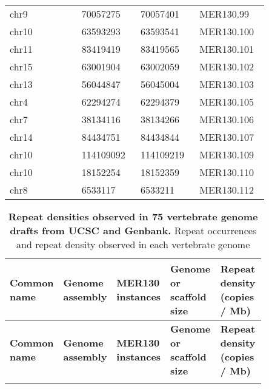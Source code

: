 \begin{center}
\begin{longtable}{@{}p{0.25\linewidth}p{0.2\linewidth}p{0.2\linewidth}p{0.2\linewidth}@{}}
chr9 & 70057275 & 70057401 & MER130.99\tabularnewline
chr10 & 63593293 & 63593541 & MER130.100\tabularnewline
chr11 & 83419419 & 83419565 & MER130.101\tabularnewline
chr15 & 63001904 & 63002059 & MER130.102\tabularnewline
chr13 & 56044847 & 56045004 & MER130.103\tabularnewline
chr4 & 62294274 & 62294379 & MER130.105\tabularnewline
chr7 & 38134116 & 38134266 & MER130.106\tabularnewline
chr14 & 84434751 & 84434844 & MER130.107\tabularnewline
chr10 & 114109092 & 114109219 & MER130.109\tabularnewline
chr10 & 18152254 & 18152359 & MER130.110\tabularnewline
chr8 & 6533117 & 6533211 & MER130.112\tabularnewline
\end{longtable}
\end{center}

\begin{center}
\begin{longtable}{@{}p{0.17\linewidth}p{0.12\linewidth}p{0.15\linewidth}p{0.2\linewidth}p{0.2\linewidth}@{}}
\caption[Repeat densities observed in 75 vertebrate genome drafts from UCSC and Genbank]{{\bf Repeat densities observed in 75 vertebrate genome drafts from UCSC and Genbank.}
Repeat occurrences and repeat density observed in each vertebrate genome
}
\label{tab:mer130TabS2} \\

\hline \textbf{Common name} & \textbf{Genome assembly} & \textbf{MER130 instances} & \textbf{Genome or scaffold size} & \textbf{Repeat density (copies / Mb)} \\ \hline 
\endfirsthead

\hline \textbf{Common name} & \textbf{Genome assembly} & \textbf{MER130 instances} & \textbf{Genome or scaffold size} & \textbf{Repeat density (copies / Mb)} \\ \hline 
\endhead

\hline
\endlastfoot


\end{longtable}
\end{center}
